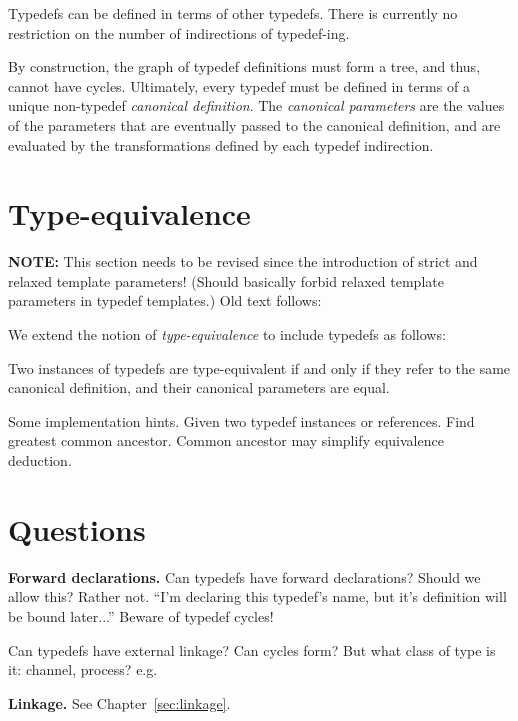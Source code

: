 Typedefs can be defined in terms of other typedefs.  
There is currently no restriction on the number of indirections
of typedef-ing.  

By construction, the graph of typedef definitions must form a tree,
and thus, cannot have cycles.  
Ultimately, every typedef must be defined in terms of a 
unique non-typedef \emph{canonical definition}.  
The \emph{canonical parameters} are the values of the 
parameters that are eventually passed to the canonical definition, 
and are evaluated by the transformations defined by each typedef indirection.  

\section{Type-equivalence}
\label{sec:typedefs:equivalence}


\textbf{NOTE:} This section needs to be revised
since the introduction of strict and relaxed template parameters!  
(Should basically forbid relaxed template parameters in typedef templates.)
Old text follows:

We extend the notion of \emph{type-equivalence} to include typedefs as follows:

Two instances of typedefs are type-equivalent if and only if
they refer to the same canonical definition, and their canonical 
parameters are equal.  

Some implementation hints.
Given two typedef instances or references.  
Find greatest common ancestor.  
Common ancestor may simplify equivalence deduction.  


\section{Questions}
\label{sec:typedefs:questions}

\textbf{Forward declarations.}
Can typedefs have forward declarations?  Should we allow this?  Rather not.
``I'm declaring this typedef's name, but it's definition will be bound
later...''
Beware of typedef cycles!

Can typedefs have external linkage?  Can cycles form?
But what class of type is it: channel, process?
e.g. 



\medskip
\textbf{Linkage.}  See Chapter~\ref{sec:linkage}.  


